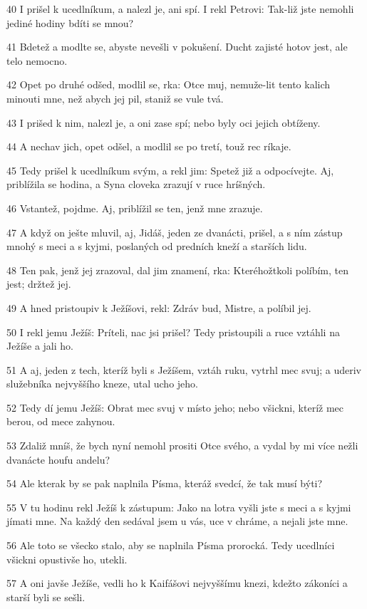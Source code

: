 \par 40 I prišel k ucedlníkum, a nalezl je, ani spí. I rekl Petrovi: Tak-liž jste nemohli jediné hodiny bdíti se mnou?
\par 41 Bdetež a modlte se, abyste nevešli v pokušení. Ducht zajisté hotov jest, ale telo nemocno.
\par 42 Opet po druhé odšed, modlil se, rka: Otce muj, nemuže-lit tento kalich minouti mne, než abych jej pil, staniž se vule tvá.
\par 43 I prišed k nim, nalezl je, a oni zase spí; nebo byly oci jejich obtíženy.
\par 44 A nechav jich, opet odšel, a modlil se po tretí, touž rec ríkaje.
\par 45 Tedy prišel k ucedlníkum svým, a rekl jim: Spetež již a odpocívejte. Aj, priblížila se hodina, a Syna cloveka zrazují v ruce hríšných.
\par 46 Vstantež, pojdme. Aj, priblížil se ten, jenž mne zrazuje.
\par 47 A když on ješte mluvil, aj, Jidáš, jeden ze dvanácti, prišel, a s ním zástup mnohý s meci a s kyjmi, poslaných od predních kneží a starších lidu.
\par 48 Ten pak, jenž jej zrazoval, dal jim znamení, rka: Kteréhožtkoli políbím, ten jest; držtež jej.
\par 49 A hned pristoupiv k Ježíšovi, rekl: Zdráv bud, Mistre, a políbil jej.
\par 50 I rekl jemu Ježíš: Príteli, nac jsi prišel? Tedy pristoupili a ruce vztáhli na Ježíše a jali ho.
\par 51 A aj, jeden z tech, kteríž byli s Ježíšem, vztáh ruku, vytrhl mec svuj; a uderiv služebníka nejvyššího kneze, utal ucho jeho.
\par 52 Tedy dí jemu Ježíš: Obrat mec svuj v místo jeho; nebo všickni, kteríž mec berou, od mece zahynou.
\par 53 Zdaliž mníš, že bych nyní nemohl prositi Otce svého, a vydal by mi více nežli dvanácte houfu andelu?
\par 54 Ale kterak by se pak naplnila Písma, kteráž svedcí, že tak musí býti?
\par 55 V tu hodinu rekl Ježíš k zástupum: Jako na lotra vyšli jste s meci a s kyjmi jímati mne. Na každý den sedával jsem u vás, uce v chráme, a nejali jste mne.
\par 56 Ale toto se všecko stalo, aby se naplnila Písma prorocká. Tedy ucedlníci všickni opustivše ho, utekli.
\par 57 A oni javše Ježíše, vedli ho k Kaifášovi nejvyššímu knezi, kdežto zákoníci a starší byli se sešli.
